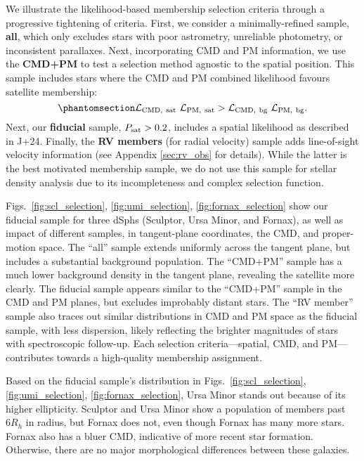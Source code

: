 We illustrate the likelihood-based membership selection criteria through
a progressive tightening of criteria. First, we consider a
minimally-refined sample, \textbf{all}, which only excludes stars with
poor astrometry, unreliable photometry, or inconsistent parallaxes.
Next, incorporating CMD and PM information, we use the \textbf{CMD+PM}
to test a selection method agnostic to the spatial position. This sample
includes stars where the CMD and PM combined likelihood favours
satellite membership:
\begin{equation}\protect\phantomsection\label{eq:sel_cmd_pm}{
{\cal L}_{\rm CMD,\ sat}\ {\cal L}_{\rm PM,\ sat} > {\cal L}_{\rm CMD,\ bg}\ {\cal L}_{\rm PM,\ bg}.
}\end{equation} Next, our \textbf{fiducial} sample,
\(P_{\rm sat} > 0.2\), includes a spatial likelihood as described in
J+24. Finally, the \textbf{RV members} (for radial velocity) sample adds
line-of-sight velocity information (see Appendix \ref{sec:rv_obs} for
details). While the latter is the best motivated membership sample, we
do not use this sample for stellar density analysis due to its
incompleteness and complex selection function.

Figs.~\ref{fig:scl_selection}, \ref{fig:umi_selection}, \ref{fig:fornax_selection}
show our fiducial sample for three dSphs (Sculptor, Ursa Minor, and
Fornax), as well as impact of different samples, in tangent-plane
coordinates, the CMD, and proper-motion space. The ``all'' sample
extends uniformly across the tangent plane, but includes a substantial
background population. The ``CMD+PM'' sample has a much lower background
density in the tangent plane, revealing the satellite more clearly. The
fiducial sample appears similar to the ``CMD+PM'' sample in the CMD and
PM planes, but excludes improbably distant stars. The ``RV member''
sample also traces out similar distributions in CMD and PM space as the
fiducial sample, with less dispersion, likely reflecting the brighter
magnitudes of stars with spectroscopic follow-up. Each selection
criteria---spatial, CMD, and PM---contributes towards a high-quality
membership assignment.

Based on the fiducial sample's distribution in
Figs.~\ref{fig:scl_selection}, \ref{fig:umi_selection}, \ref{fig:fornax_selection},
Ursa Minor stands out because of its higher ellipticity. Sculptor and
Ursa Minor show a population of members past \(6R_h\) in radius, but
Fornax does not, even though Fornax has many more stars. Fornax also has
a bluer CMD, indicative of more recent star formation. Otherwise, there
are no major morphological differences between these galaxies.

